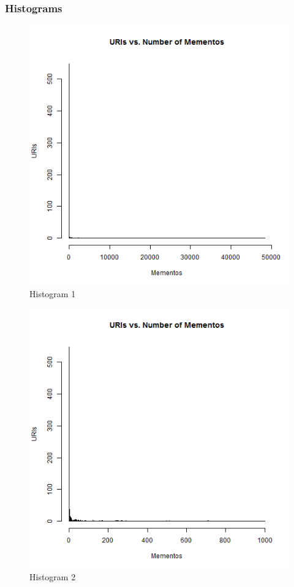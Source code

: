 \subsubsection{Histograms}
\begin{figure}[ht]    
    \begin{center}
        \includegraphics[scale=0.60]{q2-histogram1.png}
        \caption{Histogram 1}
        \label{Histogram 1}
    \end{center}
\end{figure}
\newpage
\begin{figure}[ht]    
    \begin{center}
        \includegraphics[scale=0.60]{q2-histogram2.png}
        \caption{Histogram 2}
        \label{Histogram 2}
    \end{center}
\end{figure}
